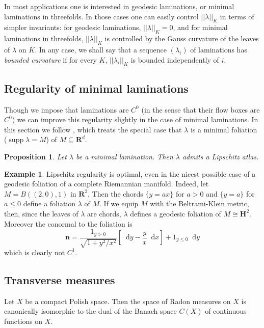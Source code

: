 \documentclass[reqno,10pt]{amsart}
\newcommand{\RR}{\mathbf{R}}
\newcommand{\Hyp}{\mathbf H}
\newcommand*\dif{\mathop{}\!\mathrm{d}}
\DeclareMathOperator{\supp}{supp}
\newcommand{\normal}{\mathbf n}
\newcommand{\dfn}[1]{\emph{#1}\index{#1}}
\newtheorem{proposition}[theorem]{Proposition}
\theoremstyle{definition}
\newtheorem{example}[theorem]{Example}
\numberwithin{equation}{section}
\begin{document}
In most applications one is interested in geodesic laminations, or minimal laminations in threefolds.
In those cases one can easily control $||\lambda||_K$ in terms of simpler invariants: for geodesic laminations, $||\lambda||_K = 0$, and for minimal laminations in threefolds, $||\lambda||_K$ is controlled by the Gauss curvature of the leaves of $\lambda$ on $K$.
In any case, we shall say that a sequence $(\lambda_i)$ of laminations has \dfn{bounded curvature} if for every $K$, $||\lambda_i||_K$ is bounded independently of $i$.


\subsection{Regularity of minimal laminations}
Though we impose that laminations are $C^0$ (in the sense that their flow boxes are $C^0$) we can improve this regularity slightly in the case of minimal laminations.
In this section we follow \cite{Solomon86}, which treats the special case that $\lambda$ is a minimal foliation ($\supp \lambda = M$) of $M \subseteq \RR^d$.

\begin{proposition}
Let $\lambda$ be a minimal lamination. Then $\lambda$ admits a Lipschitz atlas.
\end{proposition}

\begin{example}
Lipschitz regularity is optimal, even in the nicest possible case of a geodesic foliation of a complete Riemannian manifold.
Indeed, let $M = B((2, 0), 1)$ in $\RR^2$. Then the chords $\{y = ax\}$ for $a > 0$ and $\{y = a\}$ for $a \leq 0$ define a foliation $\lambda$ of $M$.
If we equip $M$ with the Beltrami-Klein metric, then, since the leaves of $\lambda$ are chords, $\lambda$ defines a geodesic foliation of $M \cong \Hyp^2$.
Moreover the conormal to the foliation is
$$\normal = \frac{1_{y > 0}}{\sqrt{1 + y^2/x^2}} \left[\dif y - \frac{y}{x} \dif x\right] + 1_{y \leq 0} \dif y$$
which is clearly not $C^1$.
\end{example}

\subsection{Transverse measures}
Let $X$ be a compact Polish space.
Then the space of Radon measures on $X$ is canonically isomorphic to the dual of the Banach space $C(X)$ of continuous functions on $X$.
\end{document}
